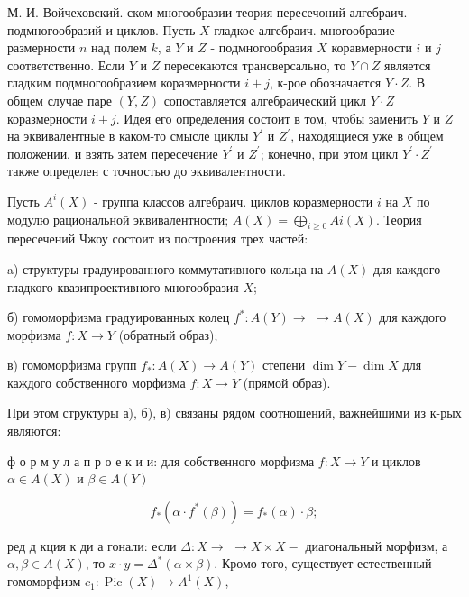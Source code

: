 \documentclass[10pt]{article}
\begin{document}
М. И. Войчеховский. ском многообразии-теория пересечөний алгебраич. подмногообразий и циклов. Пусть $X$ гладкое алгебраич. многообразие размерности $n$ над полем $k$, а $Y$ и $Z$ - подмногообразия $X$ коравмерности $i$ и $j$ соответственно. Если $Y$ и $Z$ пересекаются трансверсально, то $Y \cap Z$ является гладким подмногообразием коразмерности $i+j$, к-рое обозначается $Y \cdot Z$. В общем случае паре $(Y, Z)$ сопоставляется алгебраический цикл $Y \cdot Z$ коразмерности $i+j$. Идея его определения состоит в том, чтобы заменить $Y$ и $Z$ на эквивалентные в каком-то смысле циклы $Y^{\prime}$ и $Z^{\prime}$, находящиеся уже в общем положении, и взять затем пересечение $Y^{\prime}$ и $Z^{\prime}$; конечно, при этом цикл $Y^{\prime} \cdot Z^{\prime}$ также определен с точностью до эквивалентности.



Пусть $A^{i}(X)$ - группа классов алгебраич. циклов коразмерности $i$ на $X$ по модулю рациональной эквивалентности; $A(X)=\bigoplus_{i \geqslant 0} A i(X)$. Теория пересечений Чжоу состоит из построения трех частей:



a) структуры градуированного коммутативного кольца на $A(X)$ для каждого гладкого квазипроективного многообразия $X$;



б) гомоморфизма градуированных колец $f^{*}: A(Y) \rightarrow$ $\rightarrow A(X)$ для каждого морфизма $f: X \rightarrow Y$ (обратный образ);



в) гомоморфизма групп $f_{*}: A(X) \rightarrow A(Y)$ степени $\operatorname{dim} Y-\operatorname{dim} X$ для каждого собственного морфизма $f: X \rightarrow Y$ (прямой образ).



При этом структуры а), б), в) связаны рядом соотношений, важнейшими из к-рых являются:



ф о р м у л а п р о е к и и: для собственного морфизма $f: X \rightarrow Y$ и циклов $\alpha \in A(X)$ и $\beta \in A(Y)$



\[

f_{*}\left(\alpha \cdot f^{*}(\beta)\right)=f_{*}(\alpha) \cdot \beta ;

\]



ред д кция к ди а гонали: если $\Delta: X \rightarrow$ $\rightarrow X \times X-$ диагональный морфизм, а $\alpha, \beta \in A(X)$, то $x \cdot y=\Delta^{*}(\alpha \times \beta)$. Кромө того, существует естественный гомоморфизм $c_{1}: \operatorname{Pic}(X) \longrightarrow A^{1}(X)$,
\end{document}
